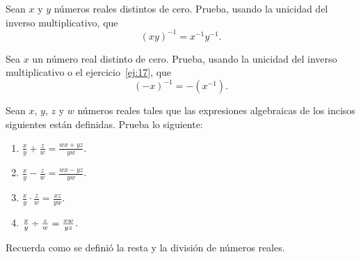 \documentclass[12pt,a4paper]{book}
\newcommand{\entre}{\mathbin{\text{\textdiv}}}
\begin{document}
    \begin{ejercicio}\label{ej:17}
        Sean $x$ y $y$ números reales distintos de cero. Prueba, usando
        la unicidad del inverso multiplicativo, que
        \begin{equation*}
            (xy)^{-1}=x^{-1}y^{-1}.
        \end{equation*}
    \end{ejercicio}

    \begin{ejercicio}\label{ej:18}
        Sea $x$ un número real distinto de cero. Prueba, usando la unicidad
        del inverso multiplicativo o el ejercicio~\ref{ej:17}, que
        \begin{equation*}
            (-x)^{-1}=-(x^{-1}).
        \end{equation*}
    \end{ejercicio}

    \begin{ejercicio}\label{ej:19}
        Sean $x$, $y$, $z$ y $w$ números
        reales tales que las expresiones algebraicas de los incisos siguientes están
        definidas. Prueba lo siguiente:
        \begin{enumerate}[nosep]
            \item $\frac{x}{y}+\frac{z}{w}=\frac{wx+yz}{yw}$.
            \item $\frac{x}{y}-\frac{z}{w}=\frac{wx-yz}{yw}$.
            \item $\frac{x}{y}\cdot\frac{z}{w}=\frac{xz}{yw}$.
            \item $\frac{x}{y}\entre\frac{z}{w}=\frac{xw}{yz}$.
        \end{enumerate}
        \sugerencia Recuerda como se definió la resta y la división de números
        reales.
    \end{ejercicio}
\end{document}
